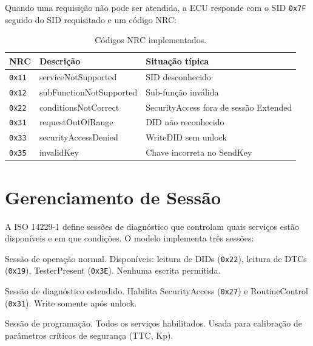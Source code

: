 \documentclass[12pt,a4paper]{article}
\newcommand{\sid}[1]{\texttt{0x#1}}
\begin{document}
Quando uma requisição não pode ser atendida, a ECU responde com o SID
\sid{7F} seguido do SID requisitado e um código NRC:

\begin{table}[H]
    \centering
    \caption{Códigos NRC implementados.}
    \label{tab:nrc}
    \begin{tabular}{@{}lll@{}}
        \toprule
        NRC & Descrição & Situação típica \\
        \midrule
        \texttt{0x11} & serviceNotSupported    & SID desconhecido \\
        \texttt{0x12} & subFunctionNotSupported & Sub-função inválida \\
        \texttt{0x22} & conditionsNotCorrect   & SecurityAccess fora de sessão Extended \\
        \texttt{0x31} & requestOutOfRange      & DID não reconhecido \\
        \texttt{0x33} & securityAccessDenied   & WriteDID sem unlock \\
        \texttt{0x35} & invalidKey             & Chave incorreta no SendKey \\
        \bottomrule
    \end{tabular}
\end{table}

\section{Gerenciamento de Sessão}
\label{sec:sessao}

A ISO 14229-1 define sessões de diagnóstico que controlam quais serviços
estão disponíveis e em que condições. O modelo implementa três sessões:

\begin{description}[style=nextline]
    \item[\textbf{Default (0x01)}]
        Sessão de operação normal. Disponíveis: leitura de DIDs (\sid{22}),
        leitura de DTCs (\sid{19}), TesterPresent (\sid{3E}). Nenhuma escrita
        permitida.
    \item[\textbf{Extended (0x02)}]
        Sessão de diagnóstico estendido. Habilita SecurityAccess (\sid{27})
        e RoutineControl (\sid{31}). Write somente após unlock.
    \item[\textbf{Programming (0x03)}]
        Sessão de programação. Todos os serviços habilitados. Usada para
        calibração de parâmetros críticos de segurança (TTC, Kp).
\end{description}
\end{document}
